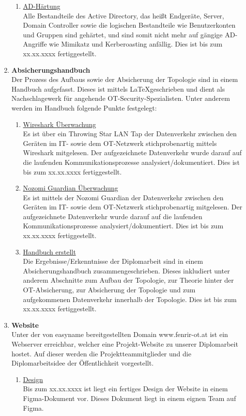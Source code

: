 \documentclass[
	headings=optiontotocandhead,%
	oneside,
	numbers=noenddot,%
	toc=flat, %
	10pt, %
	parskip=full, %
	listof=totoc, %
	listof=flat, %
	numbers=noenddot, %
	bibliography=totoc, %
	a4paper,DIV=14,
]{scrartcl}
\begin{document}
\begin{enumerate}[start=1,label={\bfseries Ziel-H \arabic*},leftmargin=*,wide]
\begin{enumerate}[label=\alph*.]
\item{\underline{AD-Härtung}}\\
Alle Bestandteile des Active Directory, das heißt Endgeräte, Server, Domain Controller sowie die logischen Bestandteile wie Benutzerkonten und Gruppen sind gehärtet, und sind somit nicht mehr auf gängige AD-Angriffe wie Mimikatz und Kerberoasting anfällig. Dies ist bis zum xx.xx.xxxx fertiggestellt.
\end{enumerate}

\item{\bfseries{Absicherungshandbuch}}\\
Der Prozess des Aufbaus sowie der Absicherung der Topologie sind in einem Handbuch aufgefasst. Dieses ist mittels \LaTeX geschrieben und dient als Nachschlagewerk für angehende OT-Security-Spezialisten. Unter anderem werden im Handbuch folgende Punkte festgelegt:
\begin{enumerate}[label=\alph*.]
\item{\underline{Wireshark Überwachung}}\\
Es ist über ein Throwing Star LAN Tap der Datenverkehr zwischen den Geräten im IT- sowie dem OT-Netzwerk stichprobenartig mittels Wireshark mitgelesen. Der aufgezeichnete Datenverkehr wurde darauf auf die laufenden Kommunikationsprozesse analysiert/dokumentiert. Dies ist bis zum xx.xx.xxxx fertiggestellt.

\item{\underline{Nozomi Guardian Überwachung}}\\
Es ist mittels der Nozomi Guardian der Datenverkehr zwischen den Geräten im IT- sowie dem OT-Netzwerk stichprobenartig mitgelesen. Der aufgezeichnete Datenverkehr wurde darauf auf die laufenden Kommunikationsprozesse analysiert/dokumentiert. Dies ist bis zum xx.xx.xxxx fertiggestellt.

\item{\underline{Handbuch erstellt}}\\
Die Ergebnisse/Erkenntnisse der Diplomarbeit sind in einem Absicherungshandbuch zusammengeschrieben. Dieses inkludiert unter anderem Abschnitte zum Aufbau der Topologie, zur Theorie hinter der OT-Absicherung, zur Absicherung der Topologie und zum aufgekommenen Datenverkehr innerhalb der Topologie. Dies ist bis zum xx.xx.xxxx fertiggestellt.
\end{enumerate}

\item{\bfseries{Website}}\\
Unter der von easyname bereitgestellten Domain www.fenrir-ot.at ist ein Webserver erreichbar, welcher eine Projekt-Website zu unserer Diplomarbeit hostet. Auf dieser werden die Projektteammitglieder und die Diplomarbeitsidee der Öffentlichkeit vorgestellt.
\begin{enumerate}[label=\alph*.]
\item{\underline{Design}}\\
Bis zum xx.xx.xxxx ist liegt ein fertiges Design der Website in einem Figma-Dokument vor. Dieses Dokument liegt in einem eignen Team auf Figma.


\end{enumerate}
\end{enumerate}
\end{document}
